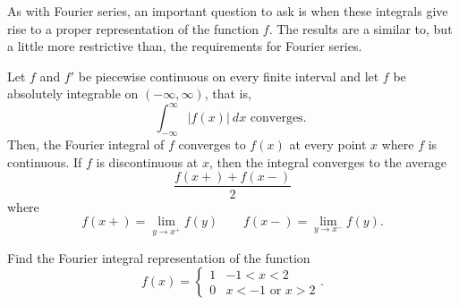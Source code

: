 \documentclass{ximera}
\begin{document}
As with Fourier series, an important question to ask is when these integrals give rise to a proper representation of the function $f$. The results are a similar to, but a little more restrictive than, the requirements for Fourier series.

\begin{theorem}
    \label{thm:fintConverge}
    Let $f$ and $f'$ be piecewise continuous on every finite interval and let $f$ be absolutely integrable on $(-\infty, \infty)$, that is, 
    \[ 
        \int_{-\infty}^\infty |f(x)| \ dx \text{ converges. } 
    \] 
    Then, the Fourier integral of $f$ converges to $f(x)$ at every point $x$ where $f$ is continuous. If $f$ is discontinuous at $x$, then the integral converges to the average
    \[ 
        \frac{f(x+) + f(x-)}{2} 
    \] 
    where 
    \[ 
        f(x+) = \lim_{y \rightarrow x^+} f(y) \qquad f(x-) = \lim_{y \rightarrow x^-} f(y). 
    \]
\end{theorem}

\begin{example}
    Find the Fourier integral representation of the function
    \[ 
        f(x) = 
        \begin{cases}
            1 & -1 < x < 2 \\
            0 & x <-1 \text{ or } x > 2
        \end{cases}.
    \]
\end{example}
\end{document}
